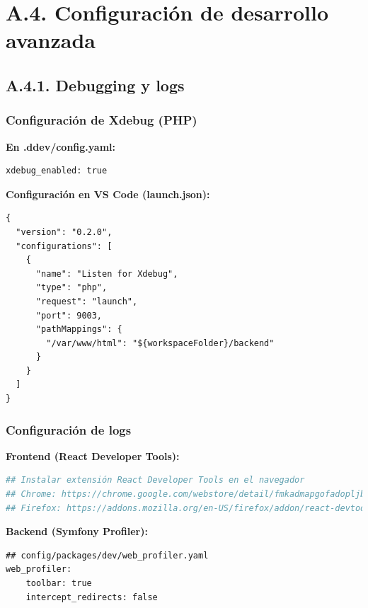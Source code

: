\documentclass[12pt,a4paper,oneside]{report}
\begin{document}
\section{A.4. Configuración de desarrollo
avanzada}\label{a.4.-configuraciuxf3n-de-desarrollo-avanzada}

\subsection{A.4.1. Debugging y logs}\label{a.4.1.-debugging-y-logs}

\subsubsection{Configuración de Xdebug
(PHP)}\label{configuraciuxf3n-de-xdebug-php}

\textbf{En .ddev/config.yaml:}

\begin{lstlisting}
xdebug_enabled: true
\end{lstlisting}

\textbf{Configuración en VS Code (launch.json):}

\begin{lstlisting}
{
  "version": "0.2.0",
  "configurations": [
    {
      "name": "Listen for Xdebug",
      "type": "php",
      "request": "launch",
      "port": 9003,
      "pathMappings": {
        "/var/www/html": "${workspaceFolder}/backend"
      }
    }
  ]
}
\end{lstlisting}

\subsubsection{Configuración de logs}\label{configuraciuxf3n-de-logs}

\textbf{Frontend (React Developer Tools):}

\begin{lstlisting}[language=bash]
## Instalar extensión React Developer Tools en el navegador
## Chrome: https://chrome.google.com/webstore/detail/fmkadmapgofadopljbjfkapdkoienihi
## Firefox: https://addons.mozilla.org/en-US/firefox/addon/react-devtools/
\end{lstlisting}

\textbf{Backend (Symfony Profiler):}

\begin{lstlisting}
## config/packages/dev/web_profiler.yaml
web_profiler:
    toolbar: true
    intercept_redirects: false
\end{lstlisting}
\end{document}
